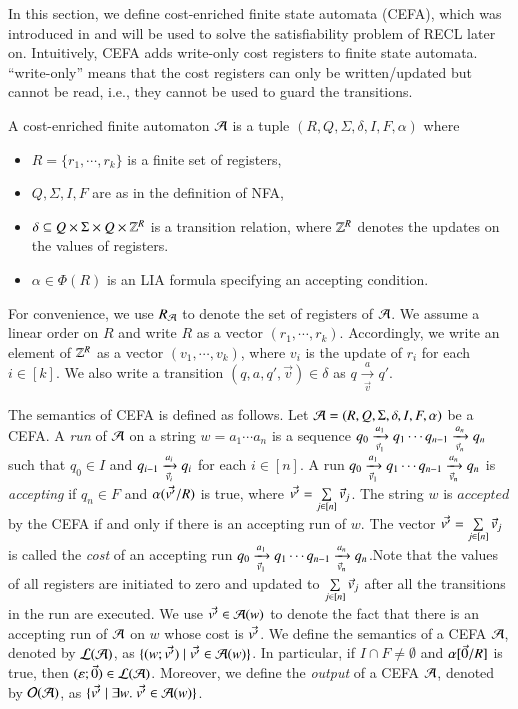 In this section, we define cost-enriched finite state automata (CEFA), which was introduced in \cite{atva2020} and will be used to solve the satisfiability problem of RECL later on. 
%
Intuitively, CEFA adds write-only cost registers to finite state automata. ``write-only'' means that the cost registers can only be written/updated but cannot be read, i.e., they cannot be used to guard the transitions. 
%
\begin{definition}
  A cost-enriched finite automaton $\mathcal{A}$ is a tuple $(R, Q, \Sigma, \delta, I, F, \alpha)$ where
  \begin{itemize}
  \item $R = \{r_1, \cdots, r_k\}$ is a finite set of registers, 
    \item $Q, \Sigma, I, F$ are as in the definition of NFA,
    \item $\delta \subseteq Q \times \Sigma \times Q \times \mathbb{Z}^R$ is a transition relation, where $\mathbb{Z}^R$ denotes the updates on the values of registers.
    \item $\alpha \in \Phi(R)$ is an LIA formula specifying an accepting condition.
  \end{itemize}
\end{definition}

For convenience, we use $R_{\mathcal{A}}$ to denote the set of registers of $\mathcal{A}$. We assume a linear order on $R$ and write $R$ as a vector $(r_1, \cdots, r_k)$. Accordingly, we write an element of $\mathbb{Z}^R$ as a vector $(v_1, \cdots, v_k)$, where $v_i$ is the update of $r_i$ for each $i \in [k]$. We also write a transition $(q, a, q', \vec{v}) \in \delta$ as $q \xrightarrow[\vec{v}]{a} q'$.

The semantics of CEFA is defined as follows. Let $\mathcal{A} = (R, Q, \Sigma, \delta, I, F, \alpha)$ be a CEFA. 
A \emph{run} of $\mathcal{A}$ on a string $w = a_1 \cdots a_n$ is a sequence $q_0 \xrightarrow[\vec{v}_1]{a_1} q_1 \cdots q_{n-1}\xrightarrow[\vec{v}_n]{a_n} q_n$ such that $q_0 \in I$ and $q_{i-1} \xrightarrow[\vec{v}_i]{a_i} q_i$ for each $i \in [n]$. A run $q_0 \xrightarrow[\vec{v}_1]{a_1} q_1 \cdots q_{n-1}\xrightarrow[\vec{v}_n]{a_n} q_n$ is \emph{accepting} if $q_n \in F$ and $\alpha(\vec{v'}/R)$ is true, where $\vec{v'} = \sum \limits_{j \in [n]} \vec{v}_j$. The string $w$ is $accepted$ by the CEFA if and only if there is an accepting run of $w$. The vector $\vec{v'}= \sum \limits_{j \in [n]} \vec{v}_j$ is called the \emph{cost} of an accepting run $q_0 \xrightarrow[\vec{v}_1]{a_1} q_1 \cdots q_{n-1}\xrightarrow[\vec{v}_n]{a_n} q_n$.Note that the values of all registers are initiated to zero and updated to $\sum \limits_{j \in [n]} \vec{v}_j$ after all the transitions in the run are executed. We use $\vec{v'} \in \mathcal{A}(w)$ to denote the fact that there is an accepting run of $\mathcal{A}$ on $w$ whose cost is $\vec{v'}$.  
We define the semantics of a CEFA $\mathcal{A}$, denoted by $\mathcal{L}(\mathcal{A})$, as $\{(w; \vec{v'}) \mid  \vec{v'} \in \mathcal{A}(w)\}$.  In particular, if $I \cap F \neq \emptyset$ and $\alpha[\vec{0}/R]$ is true, then $(\varepsilon; \vec{0}) \in \mathcal{L}(\mathcal{A})$. Moreover, we define the \emph{output} of a CEFA $\mathcal{A}$, denoted by $\mathcal{O}(\mathcal{A})$, as $\{\vec{v'} \mid  \exists w.\ \vec{v'} \in \mathcal{A}(w)\}$.

